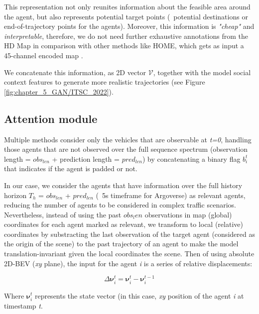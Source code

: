 This representation not only reunites information about the feasible area around the agent, but also represents potential target points \cite{dendorfer2020goal} (\ie \ potential destinations or end-of-trajectory points for the agents). Moreover, this information is \textit{"cheap"} and \textit{interpretable}, therefore, we do not need further exhaustive annotations from the HD Map in comparison with other methods like HOME, which gets as input a 45-channel encoded map \cite{gilles2021home}.

We concatenate this information, as 2D vector $\mathcal{V}$, together with the model social context features to generate more realistic trajectories (see Figure \ref{fig:chapter_5_GAN/ITSC_2022}).

\subsection{Attention module}
\label{subsec:5_attention_module}

Multiple methods \cite{liang2020learning, schmidt2022crat} consider only the vehicles that are observable at \textit{t=0}, handling those agents that are not observed over the full sequence spectrum (observation length = \textit{$obs_{len}$} + prediction length = \textit{$pred_{len}$}) by concatenating a binary flag $b_i^t$ that indicates if the agent is padded or not. 

In our case, we consider the agents that have information over the full history horizon $T_h$ = \textit{$obs_{len}$} + \textit{$pred_{len}$} (\eg \ 5s timeframe for Argoverse) as relevant agents, reducing the number of agents to be considered in complex traffic scenarios. Nevertheless, instead of using the past $obs_len$ observations in map (global) coordinates for each agent marked as relevant, we transform to local (relative) coordinates by substracting the last observation of the target agent (considered as the origin of the scene) to the past trajectory of an agent to make the model translation-invariant given the local coordinates the scene. Then of using absolute 2D-BEV (\textit{xy} plane), the input for the agent \textit{i} is a series of relative displacements:

\begin{equation}
	\Delta \boldsymbol{\nu}^{t}_i = \boldsymbol{\nu}^{t}_i - \boldsymbol{\nu}^{t-1}_i
\end{equation}

Where $\boldsymbol{\nu}^{t}_i$ represents the state vector (in this case, \textit{xy} position of the agent \textit{i} at timestamp \textit{t}. %


